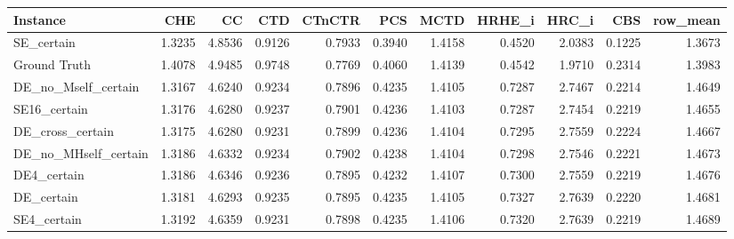 \begin{tabular}{lrrrrrrrrrr}
\toprule
Instance & CHE & CC & CTD & CTnCTR & PCS & MCTD & HRHE_i & HRC_i & CBS & row_mean \\
\midrule
SE_certain & 1.3235 & 4.8536 & 0.9126 & 0.7933 & 0.3940 & 1.4158 & 0.4520 & 2.0383 & 0.1225 & 1.3673 \\
Ground Truth & 1.4078 & 4.9485 & 0.9748 & 0.7769 & 0.4060 & 1.4139 & 0.4542 & 1.9710 & 0.2314 & 1.3983 \\
DE_no_Mself_certain & 1.3167 & 4.6240 & 0.9234 & 0.7896 & 0.4235 & 1.4105 & 0.7287 & 2.7467 & 0.2214 & 1.4649 \\
SE16_certain & 1.3176 & 4.6280 & 0.9237 & 0.7901 & 0.4236 & 1.4103 & 0.7287 & 2.7454 & 0.2219 & 1.4655 \\
DE_cross_certain & 1.3175 & 4.6280 & 0.9231 & 0.7899 & 0.4236 & 1.4104 & 0.7295 & 2.7559 & 0.2224 & 1.4667 \\
DE_no_MHself_certain & 1.3186 & 4.6332 & 0.9234 & 0.7902 & 0.4238 & 1.4104 & 0.7298 & 2.7546 & 0.2221 & 1.4673 \\
DE4_certain & 1.3186 & 4.6346 & 0.9236 & 0.7895 & 0.4232 & 1.4107 & 0.7300 & 2.7559 & 0.2219 & 1.4676 \\
DE_certain & 1.3181 & 4.6293 & 0.9235 & 0.7895 & 0.4235 & 1.4105 & 0.7327 & 2.7639 & 0.2220 & 1.4681 \\
SE4_certain & 1.3192 & 4.6359 & 0.9231 & 0.7898 & 0.4235 & 1.4106 & 0.7320 & 2.7639 & 0.2219 & 1.4689 \\
\bottomrule
\end{tabular}
